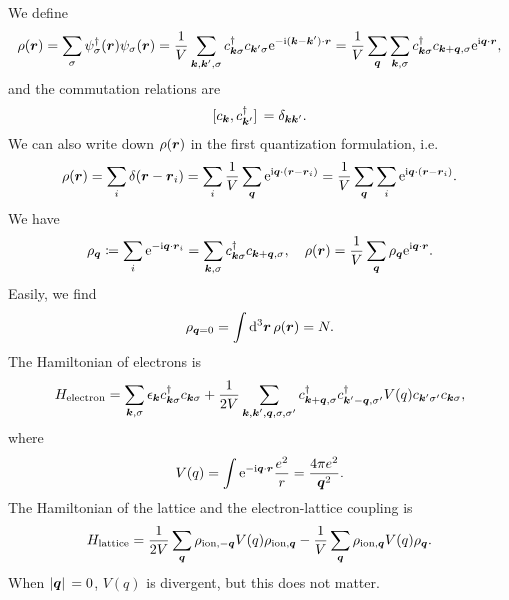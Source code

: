 \documentclass[hyperref, a4paper]{article}
\newcommand*{\ii}{\mathrm{i}}
\newcommand*{\ee}{\mathrm{e}}
\begin{document}
We define 
\begin{equation}
    \rho(\vb*{r}) = \sum_\sigma \psi^\dagger_\sigma(\vb*{r}) \psi_\sigma(\vb*{r}) 
    = \frac{1}{V} \sum_{\vb*{k}, \vb*{k}', \sigma} c^\dagger_{\vb*{k} \sigma} c_{\vb*{k}' \sigma} \ee^{- \ii (\vb*{k} - \vb*{k}') \cdot \vb*{r}} 
    = \frac{1}{V} \sum_{\vb*{q}} \sum_{\vb*{k}, \sigma} c^\dagger_{\vb*{k} \sigma} c_{\vb*{k} + \vb*{q}, \sigma} \ee^{\ii \vb*{q} \cdot \vb*{r}},
\end{equation}
and the commutation relations are 
\begin{equation}
    \comm*{c_{\vb*{k}}}{c^\dagger_{\vb*{k}'}} = \delta_{\vb*{k} \vb*{k}'}.
\end{equation}
We can also write down $\rho(\vb*{r})$ in the first quantization formulation, i.e. 
\begin{equation}
    \rho(\vb*{r}) = \sum_i \delta(\vb*{r} - \vb*{r}_i) = \sum_i \frac{1}{V} \sum_{\vb*{q}} \ee^{\ii \vb*{q} \cdot (\vb*{r} - \vb*{r}_i)} = \frac{1}{V} \sum_{\vb*{q}} \sum_i \ee^{\ii \vb*{q} \cdot (\vb*{r} - \vb*{r}_i)}.
\end{equation}
We have 
\begin{equation}
    \rho_{\vb*{q}} \coloneqq \sum_i \ee^{- \ii \vb*{q} \cdot \vb*{r}_i} = \sum_{\vb*{k}, \sigma} c^\dagger_{\vb*{k} \sigma} c_{\vb*{k} + \vb*{q}, \sigma} , \quad 
    \rho(\vb*{r}) = \frac{1}{V} \sum_{\vb*{q}} \rho_{\vb*{q}} \ee^{\ii \vb*{q} \cdot \vb*{r}}.
    \label{eq:density}
\end{equation}
Easily, we find 
\begin{equation}
    \rho_{\vb*{q} = 0} = \int \dd[3]{\vb*{r}} \rho(\vb*{r}) = N.
\end{equation}
The Hamiltonian of electrons is 
\[
    H_\text{electron} = \sum_{\vb*{k}, \sigma} \epsilon_{\vb*{k}} c^\dagger_{\vb*{k} \sigma} c_{\vb*{k} \sigma} 
    + \frac{1}{2V} \sum_{\vb*{k}, \vb*{k}', \vb*{q} , \sigma, \sigma'} 
    c^\dagger_{\vb*{k} + \vb*{q}, \sigma}  c^\dagger_{\vb*{k}' - \vb*{q}, \sigma'} V(q)
    c_{\vb*{k}' \sigma'} c_{\vb*{k} \sigma},
\]
where 
\begin{equation}
    V(q)= \int \ee^{- \ii \vb*{q} \cdot \vb*{r}} \frac{e^2}{r} = \frac{4 \pi e^2}{\vb*{q}^2}.
\end{equation}
The Hamiltonian of the lattice and the electron-lattice coupling is 
\[
    H_\text{lattice} = \frac{1}{2V} \sum_{\vb*{q}} \rho_\text{ion,$-\vb*{q}$} V(q)\rho_\text{ion,$\vb*{q}$} -
    \frac{1}{V} \sum_{\vb*{q}} \rho_\text{ion,$\vb*{q}$} V(q) \rho_{\vb*{q}}.
\]
When $\abs*{\vb*{q}} = 0$, $V(q)$ is divergent, but this does not matter. 
\end{document}
